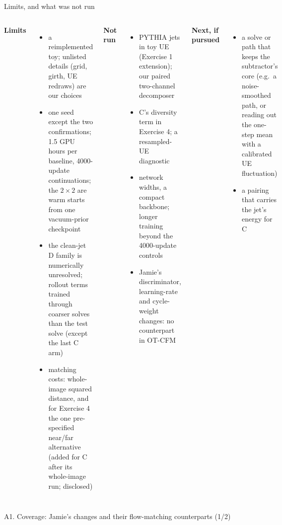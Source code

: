 \documentclass[aspectratio=169,10pt]{beamer}
\begin{document}
\begin{frame}{Limits, and what was not run}
\begin{columns}[T]
\scriptsize
\textbf{Limits}
\begin{itemize}\setlength\itemsep{0.15em}
\item a reimplemented toy; unlisted details (grid, girth, UE redraws) are our choices
\item one seed except the two confirmations; 1.5 GPU hours per baseline, 4000-update continuations;
  the $2 \times 2$ are warm starts from one vacuum-prior checkpoint
\item the clean-jet D family is numerically unresolved; rollout terms trained through coarser solves than
  the test solve (except the last C arm)
\item matching costs: whole-image squared distance, and for Exercise 4 the one pre-specified near/far
  alternative (added for C after its whole-image run; disclosed)
\end{itemize}
\scriptsize
\textbf{Not run}
\begin{itemize}\setlength\itemsep{0.15em}
\item PYTHIA jets in toy UE (Exercise 1 extension); our paired two-channel decomposer
\item C's diversity term in Exercise 4; a resampled-UE diagnostic
\item network widths, a compact backbone; longer training beyond the 4000-update controls
\item Jamie's discriminator, learning-rate and cycle-weight changes: no counterpart in OT-CFM
\end{itemize}
\vspace{0.4em}
\textbf{Next, if pursued}
\begin{itemize}\setlength\itemsep{0.15em}
\item a solve or path that keeps the subtractor's core (e.g.\ a noise-smoothed path, or reading out the
  one-step mean with a calibrated UE fluctuation)
\item a pairing that carries the jet's energy for C
\end{itemize}
\end{columns}
\end{frame}

\appendix
\begin{frame}{A1. Coverage: Jamie's changes and their flow-matching counterparts (1/2)}

\end{frame}
\end{document}

